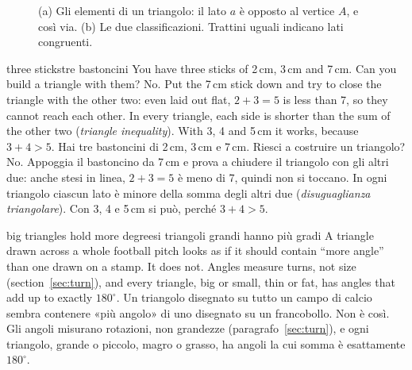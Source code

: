 \begin{figure}[htbp]
%
      {(a) Gli elementi di un triangolo: il lato $a$ è opposto al vertice $A$, e così via. (b) Le due classificazioni. Trattini uguali indicano lati congruenti.}
\label{fig:anatomy}
\end{figure}

\begin{think}{three sticks}{tre bastoncini}
You have three sticks of 2\,cm, 3\,cm and 7\,cm. Can you build a triangle with them?
\answer No. Put the 7\,cm stick down and try to close the triangle with the other two: even laid out flat, $2 + 3 = 5$ is less than 7, so they cannot reach each other. In every triangle, each side is shorter than the sum of the other two (\emph{triangle inequality}). With 3, 4 and 5\,cm it works, because $3 + 4 > 5$.
\tcblower
Hai tre bastoncini di 2\,cm, 3\,cm e 7\,cm. Riesci a costruire un triangolo?
\answer No. Appoggia il bastoncino da 7\,cm e prova a chiudere il triangolo con gli altri due: anche stesi in linea, $2 + 3 = 5$ è meno di 7, quindi non si toccano. In ogni triangolo ciascun lato è minore della somma degli altri due (\emph{disuguaglianza triangolare}). Con 3, 4 e 5\,cm si può, perché $3 + 4 > 5$.
\end{think}

\label{sec:sum180}
\begin{trap}{big triangles hold more degrees}{i triangoli grandi hanno più gradi}
A triangle drawn across a whole football pitch looks as if it should contain ``more angle'' than one drawn on a stamp. It does not. Angles measure turns, not size (section~\ref{sec:turn}), and every triangle, big or small, thin or fat, has angles that add up to exactly $180^\circ$.
\tcblower
Un triangolo disegnato su tutto un campo di calcio sembra contenere «più angolo» di uno disegnato su un francobollo. Non è così. Gli angoli misurano rotazioni, non grandezze (paragrafo~\ref{sec:turn}), e ogni triangolo, grande o piccolo, magro o grasso, ha angoli la cui somma è esattamente $180^\circ$.
\end{trap}

